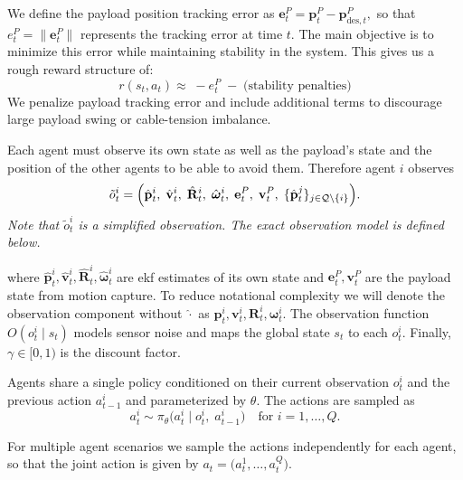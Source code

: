 We define the payload position tracking error as
$
\mathbf{e}^P_t = \mathbf{p}^P_t - \mathbf{p}^P_{\mathrm{des},t},
$
so that $e^P_t = \|\mathbf{e}^P_t\|$ represents the tracking error at time $t$. The main objective is to minimize this error while maintaining stability in the system. This gives us a rough reward structure of:
\begin{equation}
r(s_t,a_t) \approx\; - e^P_t \;-\; \text{(stability penalties)}
\end{equation}
We penalize payload tracking error and include additional terms to discourage large payload swing or cable-tension imbalance.

Each agent must observe its own state as well as the payload's state and the position of the other agents to be able to avoid them. Therefore agent $i$ observes
\begin{equation}
    \label{eq:obs}
    \tilde{o}^i_t 
    = \Bigl(
      \hat{\mathbf{p}}^i_t,\;
      \hat{\mathbf{v}}^i_t,\;
      \hat{\mathbf{R}}^i_t,\;
      \hat{\boldsymbol{\omega}}^i_t,\;
      \mathbf{e}^P_t,\;
      \mathbf{v}^P_t,\;
      \{\hat{\mathbf{p}}^j_t\}_{j \in \mathcal{Q}\setminus\{i\}}
    \Bigr).
\end{equation}
\emph{Note that \(\tilde{o}^i_t\) is a simplified observation. The exact observation model is defined below.}

where $\hat{\mathbf{p}}^i_t,\hat{\mathbf{v}}^i_t,\hat{\mathbf{R}}^i_t,\hat{\boldsymbol{\omega}}^i_t$ are \gls{ekf} estimates of its own state and $\mathbf{e}^P_t,\mathbf{v}^P_t$ are the payload state from motion capture. To reduce notational complexity we will denote the observation component without $\hat{\cdot}$ as $\mathbf{p}^i_t,\mathbf{v}^i_t,\mathbf{R}^i_t,\boldsymbol{\omega}^i_t$. The observation function $O(o^i_t \mid s_t)$ models sensor noise and maps the global state $s_t$ to each $o^i_t$. Finally, $\gamma \in [0,1)$ is the discount factor.

Agents share a single policy conditioned on their current observation \(o^i_t\) and the previous action \(a^i_{t-1}\) and parameterized by \(\theta\). The actions are sampled as
\begin{equation}
  a^i_t \sim \pi_{\theta}\bigl(a^i_t \mid o^i_t,\;a^i_{t-1}\bigr)
  \quad\text{for }i=1,\dots,Q.
\end{equation}


For multiple agent scenarios we sample the actions independently for each agent, so that the joint action is given by $a_t = \bigl(a^1_t,\dots,a^Q_t\bigr)$.



